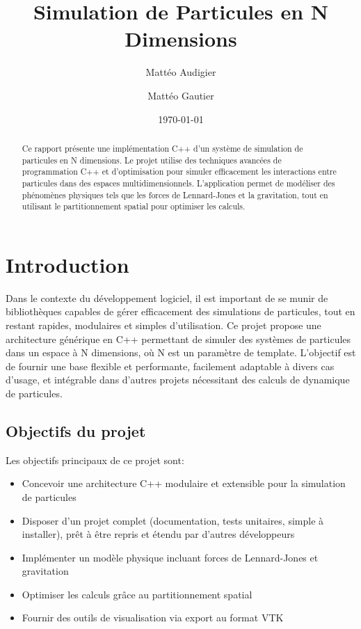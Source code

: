 \documentclass[12pt,a4paper]{article}
\title{Simulation de Particules en N Dimensions}
\author{Mattéo Audigier \and Mattéo Gautier}
\date{\today}
\begin{document}
\maketitle

\begin{abstract}
Ce rapport présente une implémentation C++ d'un système de simulation de particules en N dimensions. Le projet utilise des techniques avancées de programmation C++ et d'optimisation pour simuler efficacement les interactions entre particules dans des espaces multidimensionnels. L'application permet de modéliser des phénomènes physiques tels que les forces de Lennard-Jones et la gravitation, tout en utilisant le partitionnement spatial pour optimiser les calculs.
\end{abstract}

\newpage

\tableofcontents

\newpage

\section{Introduction}

Dans le contexte du développement logiciel, il est important de se munir de bibliothèques capables de gérer efficacement des simulations de particules, tout en restant rapides, modulaires et simples d'utilisation. Ce projet propose une architecture générique en C++ permettant de simuler des systèmes de particules dans un espace à N dimensions, où N est un paramètre de template. L'objectif est de fournir une base flexible et performante, facilement adaptable à divers cas d'usage, et intégrable dans d'autres projets nécessitant des calculs de dynamique de particules.

\subsection{Objectifs du projet}

Les objectifs principaux de ce projet sont:
\begin{itemize}
    \item Concevoir une architecture C++ modulaire et extensible pour la simulation de particules
    \item Disposer d'un projet complet (documentation, tests unitaires, simple à installer), prêt à être repris et étendu par d'autres développeurs
    \item Implémenter un modèle physique incluant forces de Lennard-Jones et gravitation
    \item Optimiser les calculs grâce au partitionnement spatial
    \item Fournir des outils de visualisation via export au format VTK
\end{itemize}
\end{document}
